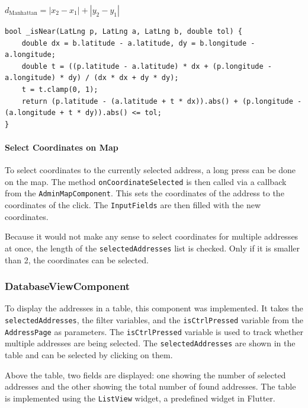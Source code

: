 \begin{center}
    {\Large  $d_{\text{Manhattan}} = |x_2 - x_1| + |y_2 - y_1|$}
\end{center}

\lstset{style=dart, caption=isNear method}
\begin{verbatim}
bool _isNear(LatLng p, LatLng a, LatLng b, double tol) {
    double dx = b.latitude - a.latitude, dy = b.longitude - a.longitude;
    double t = ((p.latitude - a.latitude) * dx + (p.longitude - a.longitude) * dy) / (dx * dx + dy * dy);
    t = t.clamp(0, 1);
    return (p.latitude - (a.latitude + t * dx)).abs() + (p.longitude - (a.longitude + t * dy)).abs() <= tol;
}
\end{verbatim}

\paragraph*{Select Coordinates on Map}
\label{fig:Select Coordinates on Map}

To select coordinates to the currently selected address, a long press can be done on the map. The method \texttt{onCoordinateSelected} is then called via a callback from the \texttt{AdminMapComponent}. This sets the coordinates of the address to the coordinates of the click. The \texttt{InputFields} are then filled with the new coordinates.\

Because it would not make any sense to select coordinates for multiple addresses at once, the length of the \texttt{selectedAddresses} list is checked. Only if it is smaller than 2, the coordinates can be selected.


\subsubsection{DatabaseViewComponent}
\label{fig:DatabaseViewComponent}
To display the addresses in a table, this component was implemented. It takes the \texttt{selectedAddresses}, the filter variables, and the \texttt{isCtrlPressed} variable from the \texttt{AddressPage} as parameters. The \texttt{isCtrlPressed} variable is used to track whether multiple addresses are being selected. The \texttt{selectedAddresses} are shown in the table and can be selected by clicking on them.\blankLine

Above the table, two fields are displayed: one showing the number of selected addresses and the other showing the total number of found addresses. The table is implemented using the \texttt{ListView} widget, a predefined widget in Flutter.


